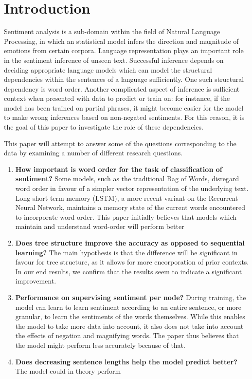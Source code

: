 \section{Introduction}
\label{sec: intro}
Sentiment analysis is a sub-domain within the field of Natural Language Processing, 
in which an statistical model infers the direction and magnitude of emotions
from certain corpora. Language representation plays an important role in 
the sentiment inference of unseen text. Successful inference depends on deciding 
appropriate language models which can model the structural dependencies within
the sentences of a language sufficiently. One such structural dependency is word order. Another
complicated aspect of inference is sufficient context when presented with data 
to predict or train on: for instance, if the model has been trained on partial phrases, 
it might become easier for the model to make wrong inferences based on 
non-negated sentiments. For this reason, it is the goal of this paper to investigate
the role of these dependencies.

This paper will attempt to answer some of the questions corresponding to the data
by examining a number of different research questions.

\begin{enumerate}
    \item \textbf{How important is word order for the task of classification of 
    sentiment?} Some models, such as the traditional Bag of Words, disregard word order in favour
    of a simpler vector representation of the underlying text. Long short-term memory 
    (LSTM), a more recent variant on the Recurrent Neural Network, 
    maintains a memory state of the current words encountered to incorporate 
    word-order. This paper initially believes that models which maintain and 
    understand word-order will perform better 
    \item \textbf{Does tree structure improve the accuracy as opposed to sequential
    learning?} The main hypothesis is that the difference will be significant
    in favour for tree structure, as it allows for more encorporation of prior
    contexts. In our end results, we confirm that the results seem to indicate
    a significant improvement.
    \item \textbf{Performance on supervising sentiment per node?}
    During training, the model can learn to learn sentiment according to an entire
    sentence, or more granular, to learn the sentiments of the words themselves.
    While this enables the model to take more data into account, it also does not
    take into account the effects of negation and magnifying words. The paper
    thus believes that the model might perform less accurately because of that.
    \item \textbf{Does decreasing sentence lengths help the model predict better?}
    The model could in theory perform
\end{enumerate}